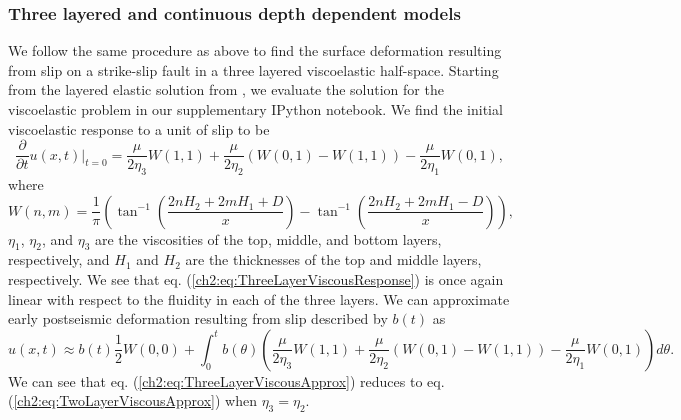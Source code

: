 \subsubsection{Three layered and continuous depth dependent models}\label{ch2:sec:2d3LModel}
We follow the same procedure as above to find the surface
deformation resulting from slip on a strike-slip fault in a three
layered viscoelastic half-space.  Starting from the layered elastic
solution from \citet{Chinnery1972}, we evaluate the solution for the
viscoelastic problem in our supplementary IPython notebook.  We find
the initial viscoelastic response to a unit of slip to be
\begin{equation}\label{ch2:eq:ThreeLayerViscousResponse}
\frac{\partial}{\partial t}u(x,t)\big|_{t=0} = 
\frac{\mu}{2\eta_3}W(1,1) + 
\frac{\mu}{2\eta_2}(W(0,1) - W(1,1)) - 
\frac{\mu}{2\eta_1}W(0,1),
\end{equation}
where
\begin{equation}
W(n,m) = \frac{1}{\pi}\left(\tan^{-1}\left(\frac{2nH_2 + 2mH_1 + D}{x}\right) - 
                            \tan^{-1}\left(\frac{2nH_2 + 2mH_1 - D}{x}\right)\right),
\end{equation}
$\eta_1$, $\eta_2$, and $\eta_3$ are the viscosities of the top,
middle, and bottom layers, respectively, and $H_1$ and $H_2$ are the
thicknesses of the top and middle layers, respectively.  We see that
eq. (\ref{ch2:eq:ThreeLayerViscousResponse}) is once again linear with
respect to the fluidity in each of the three layers.  We can
approximate early postseismic deformation resulting from slip
described by $b(t)$ as
\begin{equation}\label{ch2:eq:ThreeLayerViscousApprox}
u(x,t) \approx b(t)\frac{1}{2} W(0,0) + 
               \int_0^tb(\theta)\left(\frac{\mu}{2\eta_3}W(1,1) + 
                                      \frac{\mu}{2\eta_2}(W(0,1) - W(1,1)) -
                                      \frac{\mu}{2\eta_1}W(0,1)\right)d\theta.
\end{equation}
We can see that eq. (\ref{ch2:eq:ThreeLayerViscousApprox}) reduces to eq.
(\ref{ch2:eq:TwoLayerViscousApprox}) when $\eta_3 = \eta_2$.

